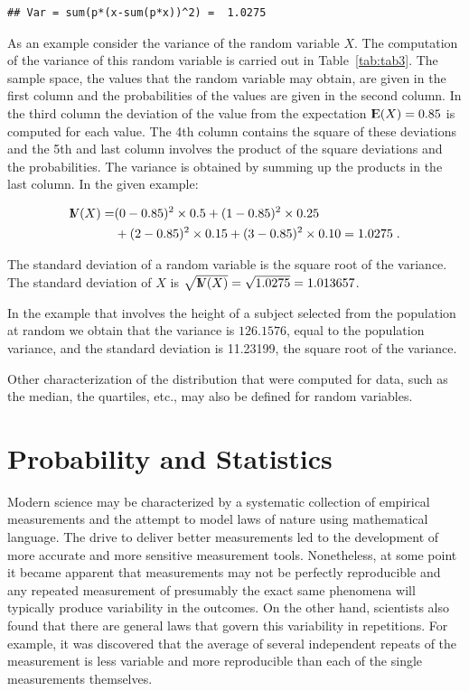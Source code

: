 \documentclass[]{krantz}
\newcommand{\Expec}{{\rm I\kern-.3em E}}
\newcommand{\Var}{{\rm I\kern-.3em V}}
\theoremstyle{definition}
\theoremstyle{definition}
\theoremstyle{definition}
\theoremstyle{remark}
\begin{document}
\begin{verbatim}
## Var = sum(p*(x-sum(p*x))^2) =  1.0275
\end{verbatim}

As an example consider the variance of the random variable \(X\). The
computation of the variance of this random variable is carried out in
Table~\ref{tab:tab3}. The sample space, the values that the random
variable may obtain, are given in the first column and the probabilities
of the values are given in the second column. In the third column the
deviation of the value from the expectation \(\Expec(X) = 0.85\) is
computed for each value. The 4th column contains the square of these
deviations and the 5th and last column involves the product of the
square deviations and the probabilities. The variance is obtained by
summing up the products in the last column. In the given example:

\[\begin{aligned}
\Var(X) = & (0-0.85)^2 \times 0.5  + (1-0.85)^2 \times 0.25 \\ &+ (2-0.85)^2\times 0.15 + (3-0.85)^2\times 0.10= 1.0275\;.\end{aligned}\]

The standard deviation of a random variable is the square root of the
variance. The standard deviation of \(X\) is
\(\sqrt{\Var(X)} = \sqrt{1.0275} = 1.013657\).

In the example that involves the height of a subject selected from the
population at random we obtain that the variance is \(126.1576\), equal
to the population variance, and the standard deviation is 11.23199, the
square root of the variance.

Other characterization of the distribution that were computed for data,
such as the median, the quartiles, etc., may also be defined for random
variables.

\section{Probability and Statistics}\label{probability-and-statistics}

Modern science may be characterized by a systematic collection of
empirical measurements and the attempt to model laws of nature using
mathematical language. The drive to deliver better measurements led to
the development of more accurate and more sensitive measurement tools.
Nonetheless, at some point it became apparent that measurements may not
be perfectly reproducible and any repeated measurement of presumably the
exact same phenomena will typically produce variability in the outcomes.
On the other hand, scientists also found that there are general laws
that govern this variability in repetitions. For example, it was
discovered that the average of several independent repeats of the
measurement is less variable and more reproducible than each of the
single measurements themselves.
\end{document}
